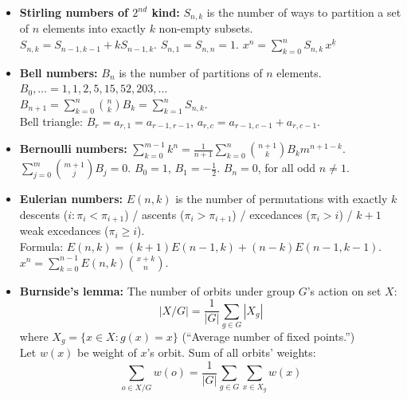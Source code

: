 \begin{small}
\begin{itemize}
    \item \textbf{Stirling numbers of $2^{nd}$ kind:}
    $S_{n,k}$ is the number of ways to partition a set of $n$ elements into exactly $k$ non-empty subsets. \\
    $S_{n,k} = S_{n-1,k-1} + k S_{n-1,k}$. \quad $S_{n,1} = S_{n,n} = 1$. \quad
    $x^n = \sum_{k=0}^n S_{n,k}\,x^{\underline k}$

    \item \textbf{Bell numbers:}
    $B_n$ is the number of partitions of $n$ elements. \\
    $B_0, \ldots = 1,1,2,5,15,52,203,\ldots$ \\
    $B_{n+1} = \sum_{k=0}^n {n \choose k} B_k = \sum_{k=1}^n S_{n,k}$. \\
    Bell triangle: $B_r=a_{r,1}=a_{r-1,r-1}$, $a_{r,c}=a_{r-1,c-1}+a_{r,c-1}$.

    \item \textbf{Bernoulli numbers:}
    $\sum_{k=0}^{m-1} k^n = \frac{1}{n+1} \sum_{k=0}^n {n+1 \choose k} B_k m^{n+1-k}$. \\
    $\sum_{j=0}^m {m+1 \choose j} B_j = 0$. \quad $B_0=1$, $B_1=-\frac{1}{2}$. \quad $B_n=0$, for all odd $n \ne 1$.

    \item \textbf{Eulerian numbers:}
    $E(n,k)$ is the number of permutations with exactly $k$ descents ($i: \pi_i < \pi_{i+1}$) / ascents ($\pi_i > \pi_{i+1}$) / excedances ($\pi_i > i$) / $k+1$ weak excedances ($\pi_i \ge i$). \\
    Formula: $E(n,k)=(k+1)E(n-1,k)+(n-k)E(n-1,k-1)$. \quad
    $x^n = \sum_{k=0}^{n-1} E(n,k) {x+k \choose n}$.

    \item \textbf{Burnside's lemma:}
    The number of orbits under group $G$'s action on set $X$:
    \[ |X/G| = \frac{1}{|G|} \sum_{g \in G} |X_g| \]
    where $X_g=\{ x \in X: g(x)=x \}$ (``Average number of fixed points.'') \\
    Let $w(x)$ be weight of $x$'s orbit. Sum of all orbits' weights:
    \[ \sum_{o \in X/G} w(o) = \frac{1}{|G|} \sum_{g \in G} \sum_{x \in X_g} w(x) \]
\end{itemize}
\end{small}